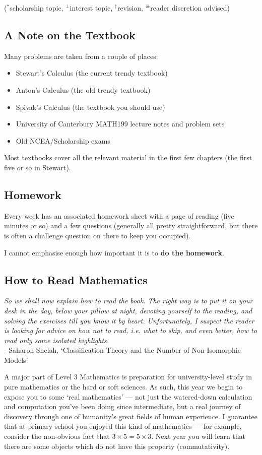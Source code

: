 ($^*$scholarship topic, $^\perp$interest topic, $^\dagger$revision, $^\skull$reader discretion advised)

\subsection*{A Note on the Textbook}
Many problems are taken from a couple of places:
\begin{itemize}
  \item Stewart's Calculus (the current trendy textbook)
  \item Anton's Calculus (the old trendy textbook)
  \item Spivak's Calculus (the textbook you should use)
  \item University of Canterbury MATH199 lecture notes and problem sets
  \item Old NCEA/Scholarship exams
\end{itemize}
Most textbooks cover all the relevant material in the first few chapters (the first five or so in Stewart).

\subsection*{Homework}
Every week has an associated homework sheet with a page of reading (five minutes or so) and a few questions (generally all
pretty straightforward, but there is often a challenge question on there to keep you occupied).

I cannot emphasise enough how important it is to \textbf{do the homework}.

\subsection*{How to Read Mathematics}
\begin{center}
  \textit{So we shall now explain how to read the book. The right way is to put it on your desk in the day, below your pillow at night, devoting yourself to the reading, and solving the exercises till you know it by heart. Unfortunately, I suspect the reader is looking for advice on how not to read, i.e. what to skip, and even better, how to read only some isolated highlights.}\\ - Saharon Shelah, `Classification Theory and the Number of Non-Isomorphic Models'
\end{center}

A major part of Level 3 Mathematics is preparation for university-level study in pure mathematics or the hard or soft sciences. As such, this
year we begin to expose you to some `real mathematics' --- not just the watered-down calculation and computation you've been doing since intermediate,
but a real journey of discovery through one of humanity's great fields of human experience. I guarantee that at primary school you enjoyed
this kind of mathematics --- for example, consider the non-obvious fact that $ 3 \times 5 = 5 \times 3 $. Next year you will learn that there are
some objects which do not have this property (commutativity).

